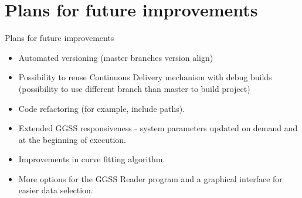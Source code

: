 \documentclass[10pt]{beamer}
\begin{document}
\section {Plans for future improvements}

\begin{frame}{Plans for future improvements}
\begin{itemize}
\item Automated versioning (master branches version align)
\item Possibility to reuse Continuous Delivery mechanism with debug builds (possibility to use different branch than master to build project)
\item Code refactoring (for example, include paths).
\item Extended GGSS responsiveness - system parameters updated on demand and at the beginning of execution.
\item Improvements in curve fitting algorithm.
\item More options for the GGSS Reader program and a graphical interface for easier data selection.
\end{itemize}
\end{frame}


\begin{frame}
\end{frame}
\end{document}
